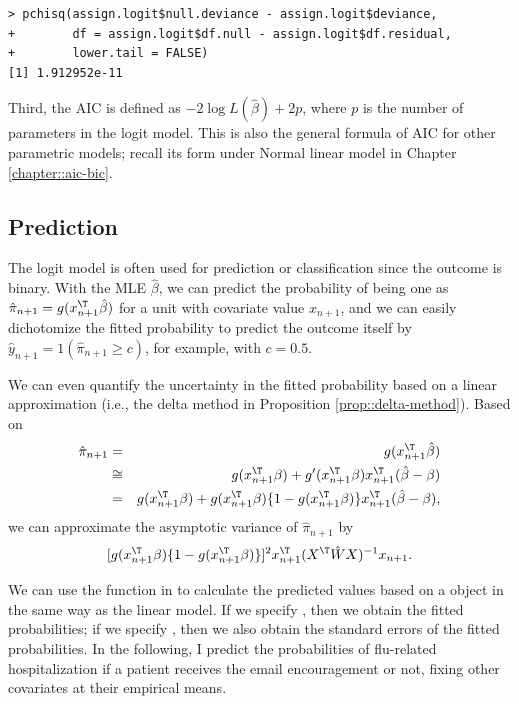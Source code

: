 \begin{lstlisting}
> pchisq(assign.logit$null.deviance - assign.logit$deviance,
+        df = assign.logit$df.null - assign.logit$df.residual,
+        lower.tail = FALSE)
[1] 1.912952e-11
\end{lstlisting}


Third, the AIC is defined as $- 2 \log L(\hat{\beta}) + 2p$, where $p$ is the number of parameters in the logit model. This is also the general formula of AIC for other parametric models; recall its form under Normal linear model in Chapter \ref{chapter::aic-bic}. 


\subsection{Prediction}

The logit model is often used for prediction or classification since the outcome is binary. With the MLE $\hat{\beta}$, we can predict the probability of being one as $\hat{\pi}_{n+1}  =  g(x_{n+1} ^{\T} \hat{\beta})$ for a unit with covariate value $x_{n+1} $, and we can easily dichotomize the fitted probability to predict the outcome itself by $\hat{y}_{n+1}  =  1(\hat{\pi}_{n+1}  \geq c)$, for example, with $c=0.5$. 


We can even quantify the uncertainty in the fitted probability based on a linear approximation (i.e., the delta method in Proposition \ref{prop::delta-method}). Based on
\begin{eqnarray*}
\hat{\pi}_{n+1}   &=&  g(x_{n+1} ^{\T} \hat{\beta}) \\
&\cong&   g(x_{n+1} ^{\T} \beta) +  g'(x_{n+1} ^{\T}  \beta) x_{n+1} ^{\T} (\hat{\beta} - \beta) \\
&=&  g(x_{n+1} ^{\T} \beta) +  g(x_{n+1} ^{\T}  \beta )  \{1-g(x_{n+1} ^{\T}  \beta ) \} x_{n+1} ^{\T} (\hat{\beta} - \beta),
\end{eqnarray*}
we can approximate the asymptotic variance of $\hat{\pi}_{n+1}  $ by
$$
 [ g(x_{n+1} ^{\T}  \beta )  \{1-g(x_{n+1} ^{\T}  \beta ) \}  ]^2 x_{n+1} ^{\T}  (X^{\T}\hat{W}X)^{-1} x_{n+1} . 
$$


We can use the  function in  to calculate the predicted values based on a  object in the same way as the linear model. If we specify , then we obtain the fitted probabilities; if we specify , then we also obtain the standard errors of the fitted probabilities. In the following, I predict the probabilities of flu-related hospitalization if a patient receives the email encouragement or not, fixing other covariates at their empirical means. 


